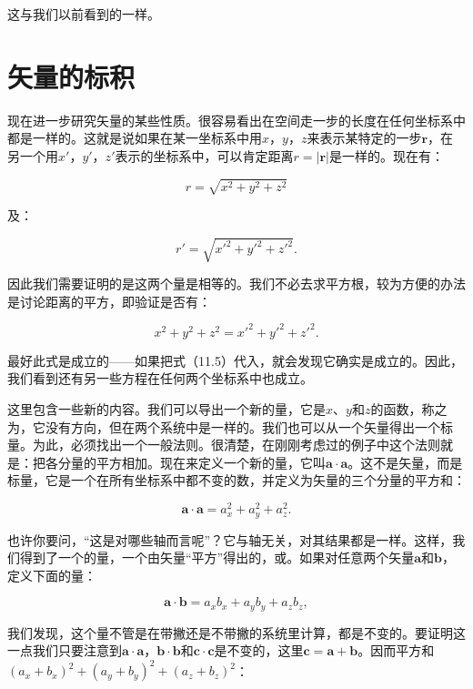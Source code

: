 \documentclass[12pt,oneside]{book}
\providecommand{\abs}[1]{\lvert#1\rvert}
\providecommand{\FLPvec}[1]{\boldsymbol{#1}}
\providecommand{\FLPa}[0]{\FLPvec{a}}
\providecommand{\FLPb}[0]{\FLPvec{b}}
\providecommand{\FLPr}[0]{\FLPvec{r}}
\begin{document}
这与我们以前看到的一样。


\section{矢量的标积}
现在进一步研究矢量的某些性质。很容易看出在空间走一步的长度在任何坐标系中都是一样的。这就是说如果在某一坐标系中用$x$，$y$，$z$来表示某特定的一步$\boldsymbol{r}$，在另一个用$x'$，$y'$，$z'$表示的坐标系中，可以肯定距离$r=\abs{\FLPr}$是一样的。现在有：


\begin{equation*}
r=\sqrt{x^2+y^2+z^2}
\end{equation*}

及：

\begin{equation*}
r'=\sqrt{x'^2+y'^2+z'^2}.
\end{equation*}

因此我们需要证明的是这两个量是相等的。我们不必去求平方根，较为方便的办法是讨论距离的平方，即验证是否有：


\begin{equation}
\label{Eq:I:11:17}
x^2+y^2+z^2=x'^2+y'^2+z'^2.
\end{equation}

最好此式是成立的——如果把式（11.5）代入，就会发现它确实是成立的。因此，我们看到还有另一些方程在任何两个坐标系中也成立。


这里包含一些新的内容。我们可以导出一个新的量，它是$x$、$y$和$z$的函数，称之为，它没有方向，但在两个系统中是一样的。我们也可以从一个矢量得出一个标量。为此，必须找出一个一般法则。很清楚，在刚刚考虑过的例子中这个法则就是：把各分量的平方相加。现在来定义一个新的量，它叫$\boldsymbol{a} \cdot \boldsymbol{a}$。这不是矢量，而是标量，它是一个在所有坐标系中都不变的数，并定义为矢量的三个分量的平方和：


\begin{equation}
\label{Eq:I:11:18}
\FLPa\cdot\FLPa=a_x^2+a_y^2+a_z^2.
\end{equation}

也许你要问，“这是对哪些轴而言呢”？它与轴无关，对其结果都是一样。这样，我们得到了一个的量，一个由矢量“平方”得出的，或。如果对任意两个矢量$\boldsymbol{a}$和$\boldsymbol{b}$，定义下面的量：


\begin{equation}
\label{Eq:I:11:19}
\FLPa\cdot\FLPb=a_xb_x+a_yb_y+a_zb_z,
\end{equation}

我们发现，这个量不管是在带撇还是不带撇的系统里计算，都是不变的。要证明这一点我们只要注意到$\boldsymbol{a} \cdot \boldsymbol{a}$，$\boldsymbol{b} \cdot \boldsymbol{b}$和$\boldsymbol{c} \cdot \boldsymbol{c}$是不变的，这里$\boldsymbol{c} = \boldsymbol{a} + \boldsymbol{b}$。因而平方和 $ (a_x + b_x)^2 + (a_y + b_y)^2 + (a_z + b_z)^2 $：
\end{document}
